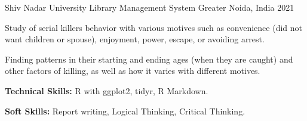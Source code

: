\begin{cventries}
  \cventry
    {Shiv Nadar University} %
    {Library Management System} %
    {Greater Noida, India} %
    {2021} %
    {
      \begin{cvitems} %
        \item {Study of serial killers behavior with various motives such as convenience (did not want children or spouse), enjoyment, power, escape, or avoiding arrest.}
        \item {Finding patterns in their starting and ending ages (when they are caught) and other factors of killing, as well as how it varies with different motives.}
        \item {\textbf{Technical Skills:} R with ggplot2, tidyr, R Markdown.}
        \item {\textbf{Soft Skills:} Report writing, Logical Thinking, Critical Thinking.}
      \end{cvitems}
    }

\end{cventries}
